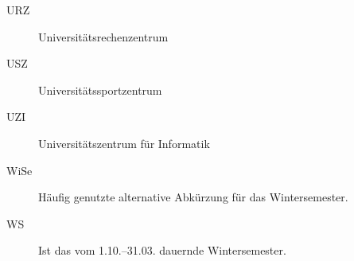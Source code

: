 \begin{description}
\item[URZ] Universitätsrechenzentrum\\
\item[USZ] Universitätssportzentrum\\
\item[UZI] Universitätszentrum für Informatik\\
\item[WiSe] Häufig genutzte alternative Abkürzung für das Wintersemester.
\item[WS] Ist das vom 1.10.--31.03. dauernde Wintersemester.
\end{description}

